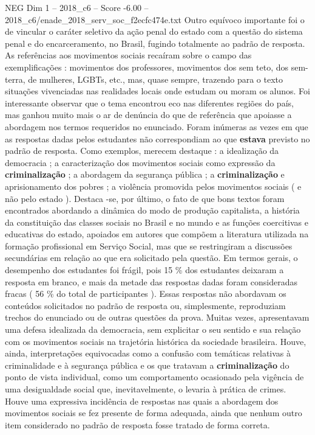 \begin{textsample}{NEG Dim 1 – 2018\_c6 – Score -6.00 – 2018\_c6/enade\_2018\_serv\_soc\_f2ecfc474e.txt}
Outro equívoco importante foi o de vincular o caráter seletivo da ação penal do estado com a questão do sistema penal e do encarceramento, no Brasil, fugindo totalmente ao padrão de resposta.
As referências aos movimentos sociais recaíram sobre o campo das exemplificações : movimentos dos professores, movimentos dos sem teto, dos sem-terra, de mulheres, LGBTs, etc., mas, quase sempre, trazendo para o texto situações vivenciadas nas realidades locais onde estudam ou moram os alunos.
Foi interessante observar que o tema encontrou eco nas diferentes regiões do país, mas ganhou muito mais o ar de denúncia do que de referência que apoiasse a abordagem nos termos requeridos no enunciado.
Foram inúmeras as vezes em que as respostas dadas pelos estudantes não correspondiam ao que \textbf{estava} previsto no padrão de resposta.
Como exemplos, merecem destaque : a idealização da democracia ; a caracterização dos movimentos sociais como expressão da \textbf{criminalização} ; a abordagem da segurança pública ; a \textbf{criminalização} e aprisionamento dos pobres ; a violência promovida pelos movimentos sociais ( e não pelo estado ).
Destaca -se, por último, o fato de que bons textos foram encontrados abordando a dinâmica do modo de produção capitalista, a história da constituição das classes sociais no Brasil e no mundo e as funções coercitivas e educativas do estado, apoiados em autores que compõem a literatura utilizada na formação profissional em Serviço Social, mas que se restringiram a discussões secundárias em relação ao que era solicitado pela questão.
Em termos gerais, o desempenho dos estudantes foi frágil, pois 15 \% dos estudantes deixaram a resposta em branco, e mais da metade das respostas dadas foram consideradas fracas ( 56 \% do total de participantes ).
Essas respostas não abordavam os conteúdos solicitados no padrão de resposta ou, simplesmente, reproduziam trechos do enunciado ou de outras questões da prova.
Muitas vezes, apresentavam uma defesa idealizada da democracia, sem explicitar o seu sentido e sua relação com os movimentos sociais na trajetória histórica da sociedade brasileira.
Houve, ainda, interpretações equivocadas como a confusão com temáticas relativas à criminalidade e à segurança pública e os que tratavam a \textbf{criminalização} do ponto de vista individual, como um comportamento ocasionado pela vigência de uma desigualdade social que, inevitavelmente, o levaria à prática de crimes.
Houve uma expressiva incidência de respostas nas quais a abordagem dos movimentos sociais se fez presente de forma adequada, ainda que nenhum outro item considerado no padrão de resposta fosse tratado de forma correta.

\end{textsample}
